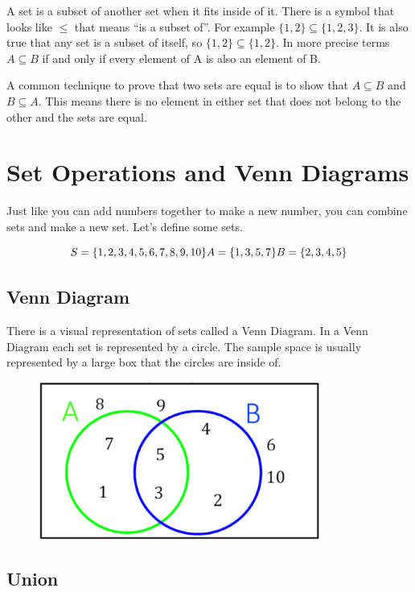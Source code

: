\documentclass[]{book}
\begin{document}
A set is a subset of another set when it fits inside of it. There is a
symbol that looks like \(\leq\) that means ``is a subset of''. For
example \(\{1,2\} \subseteq \{1,2,3\}\). It is also true that any set is
a subset of itself, so \(\{1,2\} \subseteq \{1,2\}\). In more precise
terms \(A \subseteq B\) if and only if every element of A is also an
element of B.

A common technique to prove that two sets are equal is to show that
\(A \subseteq B\) and \(B \subseteq A\). This means there is no element
in either set that does not belong to the other and the sets are equal.

\section{Set Operations and Venn
Diagrams}\label{set-operations-and-venn-diagrams}

Just like you can add numbers together to make a new number, you can
combine sets and make a new set. Let's define some sets.

\[S = \{1,2,3,4,5,6,7,8,9,10\} \\
 A = \{1,3,5,7\} \\
 B = \{2,3,4,5\}\]

\subsection{Venn Diagram}\label{venn-diagram}

There is a visual representation of sets called a Venn Diagram. In a
Venn Diagram each set is represented by a circle. The sample space is
usually represented by a large box that the circles are inside of.

\begin{figure}
\centering
\includegraphics{Pictures/01-Sets/Venn.PNG}
\caption{}
\end{figure}

\subsection{Union}\label{union}
\end{document}
